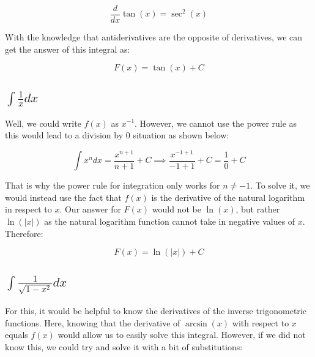 \documentclass[12pt]{article}
\begin{document}
$$
    \frac{d}{dx} \tan(x) = \sec^2(x)
$$

With the knowledge that antiderivatives are the opposite of derivatives, we can get the answer of this integral as:

$$
    F(x) = \tan(x) + C
$$

\subsection {$\int \frac{1}{x} dx$}

Well, we could write $f(x)$ as $x^{-1}$. However, we cannot use the power rule as this would lead to a division by $0$ situation as shown below:

$$
    \int x^{n} dx = \frac{x^{n+1}}{n+1} + C \implies
    \frac{x^{-1 + 1}}{-1 + 1} + C = \frac{1}{0} + C
$$

That is why the power rule for integration only works for $n \neq -1$. To solve it, we would instead use the fact that $f(x)$ is the derivative of the natural logarithm in respect to $x$. Our answer for $F(x)$ would not be $\ln(x)$, but rather $\ln(|x|)$ as the natural logarithm function cannot take in negative values of $x$. Therefore:

$$
    F(x) = \ln(|x|) + C
$$

\subsection{$\int \frac{1}{\sqrt{1-x^2}} dx$}

For this, it would be helpful to know the derivatives of the inverse trigonometric functions. Here, knowing that the derivative of $\arcsin(x)$ with respect to $x$ equals $f(x)$ would allow us to easily solve this integral. However, if we did not know this, we could try and solve it with a bit of substitutions:
\end{document}
